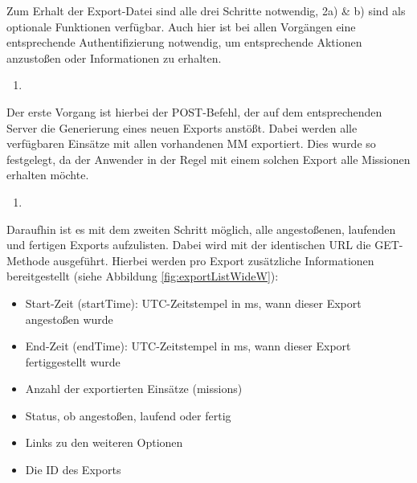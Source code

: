 Zum Erhalt der Export-Datei sind alle drei Schritte notwendig, 2a) \& b) sind als optionale Funktionen verfügbar.
Auch hier ist bei allen Vorgängen eine entsprechende Authentifizierung notwendig, um entsprechende Aktionen anzustoßen oder Informationen zu erhalten.

\begin{enumerate}
\item {}
\end{enumerate}
Der erste Vorgang ist hierbei der POST-Befehl, der auf dem entsprechenden Server die Generierung eines neuen Exports anstößt.
Dabei werden alle verfügbaren Einsätze mit allen vorhandenen \gls{MM} exportiert.
Dies wurde so festgelegt, da der Anwender in der Regel mit einem solchen Export alle Missionen erhalten möchte.

\begin{enumerate}[resume]
\item {}
\end{enumerate}

Daraufhin ist es mit dem zweiten Schritt möglich, alle angestoßenen, laufenden und fertigen Exports aufzulisten.
Dabei wird mit der identischen URL die GET-Methode ausgeführt.
Hierbei werden pro Export zusätzliche Informationen bereitgestellt (siehe Abbildung \ref{fig:exportListWideW}): 


\begin{itemize}
\item Start-Zeit (\glqq startTime\grqq): UTC-Zeitstempel in ms, wann dieser Export angestoßen wurde
\item End-Zeit (\glqq endTime\grqq): UTC-Zeitstempel in ms, wann dieser Export fertiggestellt wurde
\item Anzahl der exportierten Einsätze (\glqq missions\grqq)
\item Status, ob angestoßen, laufend oder fertig
\item Links zu den weiteren Optionen
\item Die ID des Exports
\end{itemize}

